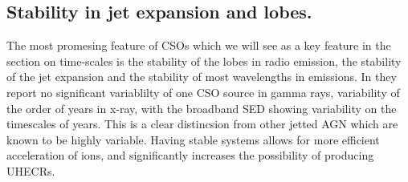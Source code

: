 \subsection{Stability in jet expansion and lobes.} The most promesing feature of CSOs which we will see as a key feature in the section on time-scales is the stability of the lobes in radio emission, the stability of the jet expansion and the stability of most wavelengths in emissions. In \cite{bronzini2024investigating} they report no significant variablilty of one CSO source in gamma rays, variability of the order of years in x-ray, with the broadband SED showing variability on the timescales of years. This is a clear distincsion from other jetted AGN which are known to be highly variable. Having stable systems allows for more efficient acceleration of ions, and significantly increases the possibility of producing UHECRs. 